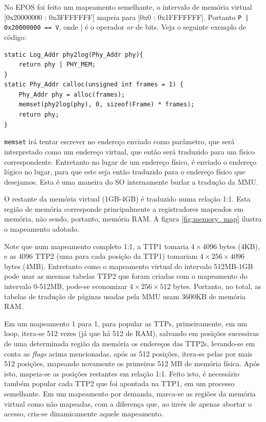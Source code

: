 No EPOS foi feito um mapeamento semelhante, o intervalo de memória virtual [0x20000000 : 0x3FFFFFFF] mapeia para [0x0 : 0x1FFFFFFF]. Portanto \verb+P | 0x20000000 == V+, onde | é o operador \emph{or} de bits. Veja o seguinte exemplo de código:

\begin{lstlisting}
static Log_Addr phy2log(Phy_Addr phy){
    return phy | PHY_MEM;
}
static Phy_Addr calloc(unsigned int frames = 1) {
    Phy_Addr phy = alloc(frames);
    memset(phy2log(phy), 0, sizeof(Frame) * frames);
    return phy;
}
\end{lstlisting}


\verb+memset+ irá tentar escrever no endereço enviado como parâmetro, que será interpretado como um endereço virtual, que então será traduzido para um físico correspondente. Entretanto no lugar de um endereço físico, é enviado o endereço lógico no lugar, para que este seja então traduzido para o endereço físico que desejamos. Esta é uma maneira do SO internamente burlar a tradução da MMU.

O restante da memória virtual (1GB-4GB) é traduzido numa relação 1:1. Esta região de memória corresponde principalmente a registradores mapeados em memória, não sendo, portanto, memória RAM. A figura \ref{fig:memory_map} ilustra o mapeamento adotado.

Note que num mapeamento completo 1:1, a TTP1 tomaria $4\times4096$ bytes (4KB), e as 4096 TTP2 (uma para cada posição da TTP1) tomariam $4\times256\times4096$ bytes (4MB). Entretanto como o mapeamento virtual do intervalo 512MB-1GB pode usar as mesmas tabelas TTP2 que foram criadas com o mapeamento do intervalo 0-512MB, pode-se economizar $4\times256\times512$ bytes. Portanto, no total, as tabelas de tradução de páginas usadas pela MMU usam 3600KB de memória RAM.


Em um mapeamento 1 para 1, para popular as TTPs, primeiramente, em um loop, itera-se 512 vezes (já que há 512 de RAM), salvando em posições sucessivas de uma determinada região da memória os endereços das TTP2s, levando-se em conta as \emph{flags} acima mencionadas, após as 512 posições, itera-se pelas por mais 512 posições, mapeando novamente os primeiros 512 MB de memória física. Após isto, mapeia-se as posições restantes em relação 1:1. Feito isto, é necessário também popular cada TTP2 que foi apontada na TTP1, em um processo semelhante. Em um mapeamento por demanda, marca-se as regiões da memória virtual como não mapeadas, com a diferença que, ao invés de apenas abortar o acesso, cria-se dinamicamente aquele mapeamento.

